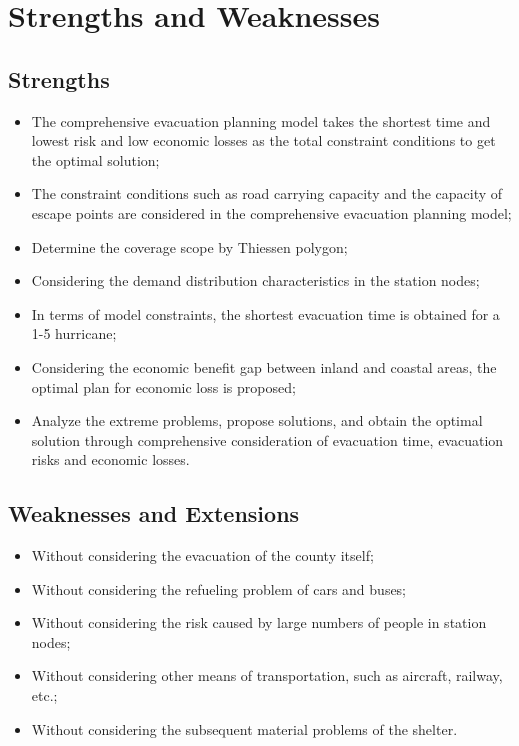 \documentclass{mcmthesis}
\begin{document}
\section{Strengths and Weaknesses}

\subsection{Strengths}

\begin{itemize}
  \item The comprehensive evacuation planning model takes the shortest time and lowest risk and low economic losses as the total constraint conditions to get the optimal solution;
  \item The constraint conditions such as road carrying capacity and the capacity of escape points are considered in the comprehensive evacuation planning model;
  \item Determine the coverage scope by Thiessen polygon;
  \item Considering the demand distribution characteristics in the station nodes;
  \item In terms of model constraints, the shortest evacuation time is obtained for a 1-5 hurricane;
  \item Considering the economic benefit gap between inland and coastal areas, the optimal plan for economic loss is proposed;
  \item Analyze the extreme problems, propose solutions, and obtain the optimal solution through comprehensive consideration of evacuation time, evacuation risks and economic losses.
\end{itemize}

\subsection{Weaknesses and Extensions}
\begin{itemize}
  \item Without considering the evacuation of the county itself;
  \item Without considering the refueling problem of cars and buses;
  \item Without considering the risk caused by large numbers of people in station nodes;
  \item Without considering other means of transportation, such as aircraft, railway, etc.;
  \item Without considering the subsequent material problems of the shelter.
\end{itemize}
\end{document}
